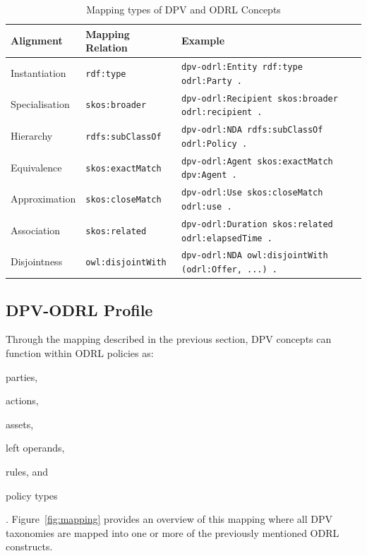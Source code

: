 \begin{table}[ht]
    \centering
    \caption{Mapping types of DPV and ODRL Concepts}
    \label{tab:mapping}
    \begin{tabular}{lll}
        \toprule
        \textbf{Alignment} & \textbf{Mapping Relation} & \textbf{Example} \\
        \midrule
        Instantiation & \texttt{rdf:type} & \texttt{dpv-odrl:Entity rdf:type odrl:Party .} \\
        Specialisation & \texttt{skos:broader} & \texttt{dpv-odrl:Recipient skos:broader odrl:recipient .} \\
        Hierarchy & \texttt{rdfs:subClassOf} & \texttt{dpv-odrl:NDA rdfs:subClassOf odrl:Policy .} \\
        Equivalence & \texttt{skos:exactMatch} & \texttt{dpv-odrl:Agent skos:exactMatch dpv:Agent .} \\
        Approximation & \texttt{skos:closeMatch} & \texttt{dpv-odrl:Use skos:closeMatch odrl:use .} \\
        Association & \texttt{skos:related} & \texttt{dpv-odrl:Duration skos:related odrl:elapsedTime .} \\
        Disjointness & \texttt{owl:disjointWith} & \texttt{dpv-odrl:NDA owl:disjointWith (odrl:Offer, ...) .} \\
        \bottomrule
    \end{tabular}
\end{table}

\subsection{DPV-ODRL Profile}
\label{sec:profile}

Through the mapping described in the previous section,
DPV concepts can function within ODRL policies as:
\begin{inlinelist}
    \item parties,
    \item actions,
    \item assets,
    \item left operands,
    \item rules, and
    \item policy types
\end{inlinelist}.
Figure~\ref{fig:mapping}
provides an overview of this mapping where all DPV taxonomies
are mapped into one or more of the previously mentioned ODRL constructs.

